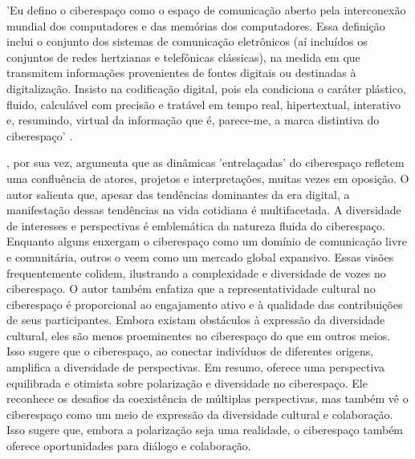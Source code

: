 \begin{citacao}
	'Eu defino o ciberespaço como o espaço de comunicação aberto pela interconexão mundial dos computadores e das memórias dos computadores. Essa definição inclui o conjunto dos sistemas de comunicação eletrônicos (aí incluídos os conjuntos de redes hertzianas e telefônicas clássicas), na medida em que transmitem informações provenientes de fontes digitais ou destinadas à digitalização. Insisto na codificação digital, pois ela condiciona o caráter plástico, fluido, calculável com precisão e tratável em tempo real, hipertextual, interativo e, resumindo, virtual da informação que é, parece-me, a marca distintiva do ciberespaço' \cite[p. 102]{2010_Levy_BOOK}.
\end{citacao}

, por sua vez, argumenta que as dinâmicas 'entrelaçadas' do ciberespaço refletem uma confluência de atores, projetos e interpretações, muitas vezes em oposição. O autor salienta que, apesar das tendências dominantes da era digital, a manifestação dessas tendências na vida cotidiana é multifacetada. A diversidade de interesses e perspectivas é emblemática da natureza fluida do ciberespaço. Enquanto alguns enxergam o ciberespaço como um domínio de comunicação livre e comunitária, outros o veem como um mercado global expansivo. Essas visões frequentemente colidem, ilustrando a complexidade e diversidade de vozes no ciberespaço. O autor também enfatiza que a representatividade cultural no ciberespaço é proporcional ao engajamento ativo e à qualidade das contribuições de seus participantes. Embora existam obstáculos à expressão da diversidade cultural, eles são menos proeminentes no ciberespaço do que em outros meios. Isso sugere que o ciberespaço, ao conectar indivíduos de diferentes origens, amplifica a diversidade de perspectivas. Em resumo,  oferece uma perspectiva equilibrada e otimista sobre polarização e diversidade no ciberespaço. Ele reconhece os desafios da coexistência de múltiplas perspectivas, mas também vê o ciberespaço como um meio de expressão da diversidade cultural e colaboração. Isso sugere que, embora a polarização seja uma realidade, o ciberespaço também oferece oportunidades para diálogo e colaboração.

